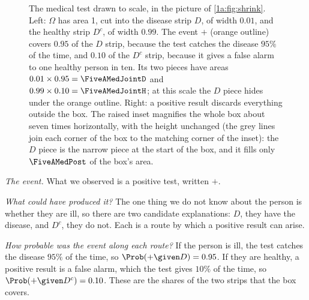 \begin{figure}[htbp]
\caption{The medical test drawn to scale, in the picture of \cref{1a:fig:shrink}.
Left: $\Omega$ has area 1, cut into the disease strip $D$, of width $0.01$, and the
healthy strip $D^c$, of width $0.99$. The event $+$ (orange outline) covers $0.95$
of the $D$ strip, because the test catches the disease $95\%$ of the time, and
$0.10$ of the $D^c$ strip, because it gives a false alarm to one healthy person in
ten. Its two pieces have areas $0.01\times0.95=\FiveAMedJointD$ and
$0.99\times0.10=\FiveAMedJointH$; at this scale the $D$ piece hides under the
orange outline. Right: a positive result discards everything outside the box.
The raised inset magnifies the whole box about seven times horizontally, with the height unchanged (the grey lines join each corner of the box to the matching corner of the inset): the $D$ piece is the narrow piece at the start of the box, and it fills only $\FiveAMedPost$ of the box's area.}
\label{5a:fig:medical}
\end{figure}

\emph{The event.} What we observed is a positive test, written $+$.

\emph{What could have produced it?} The one thing we do not know about the person
is whether they are ill, so there are two candidate explanations: $D$, they have
the disease, and $D^c$, they do not. Each is a route by which a positive result
can arise.

\emph{How probable was the event along each route?} If the person is ill, the
test catches the disease $95\%$ of the time, so $\Prob(+\given D)=0.95$. If they
are healthy, a positive result is a false alarm, which the test gives $10\%$ of
the time, so $\Prob(+\given D^c)=0.10$. These are the shares of the two strips
that the box covers.

